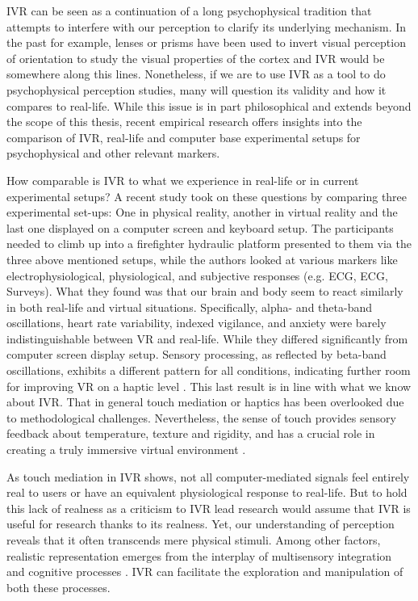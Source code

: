 \documentclass[12pt,oneside,openright]{report}
\begin{document}
IVR can be seen as a continuation of a long psychophysical tradition that attempts to interfere with our perception to clarify its underlying mechanism. In the past for example, lenses or prisms have been used to invert visual perception of orientation to study the visual properties of the cortex \parencite{deGelder2018VirtualRA} and IVR would be somewhere along this lines. Nonetheless, if we are to use IVR as a tool to do psychophysical perception studies, many will question its validity and how it compares to real-life. While this issue is in part philosophical and extends beyond the scope of this thesis, recent empirical research offers insights into the comparison of IVR, real-life and computer base experimental setups for psychophysical and other relevant markers.

How comparable is IVR to what we experience in real-life or in current experimental setups? A recent study took on these questions by comparing three experimental set-ups: One in physical reality, another in virtual reality and the last one displayed on a computer screen and keyboard setup. The participants needed to climb up into a firefighter hydraulic platform presented to them via the three above mentioned setups, while the authors looked at various markers like electrophysiological, physiological, and subjective responses (e.g. ECG, ECG, Surveys). What they found was that our brain and body seem to react similarly in both real-life and virtual situations. Specifically, alpha- and theta-band oscillations, heart rate variability, indexed vigilance, and anxiety were barely indistinguishable between VR and real-life. While they differed significantly from computer screen display setup. Sensory processing, as reflected by beta-band oscillations, exhibits a different pattern for all conditions, indicating further room for improving VR on a haptic level \parencite{Schne2023TheRO}. This last result is in line with what we know about IVR. That in general touch mediation or haptics has been overlooked due to methodological challenges. Nevertheless, the sense of touch provides sensory feedback about temperature, texture and rigidity, and has a crucial role in creating a truly immersive virtual environment \parencite{Zhang2023ActiveMH}.

As touch mediation in IVR shows, not all computer-mediated signals feel entirely real to users or have an equivalent physiological response to real-life.  But to hold this lack of realness as a criticism to IVR lead research would assume that IVR is useful for research thanks to its realness. Yet, our understanding of perception reveals that it often transcends mere physical stimuli. Among other factors, realistic representation emerges from the interplay of multisensory integration and cognitive processes \parencite{deGelder2018VirtualRA}. IVR can facilitate the exploration and manipulation of both these processes.
\end{document}
